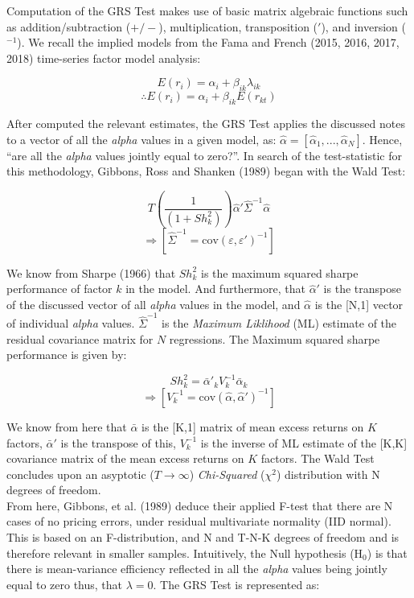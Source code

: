 \documentclass[11pt, english]{article}
\begin{document}
        Computation of the GRS Test makes use of basic matrix algebraic functions such as addition/subtraction ($+/-$), multiplication, transposition ($'$), and inversion ($^{-1}$). We recall the implied models from the Fama and French (2015, 2016, 2017, 2018) time-series factor model analysis:

        $$E(r_i)=\alpha_i+\beta_{ik}\lambda_{ik}$$
        $$\therefore E(r_i)=\alpha_i+\beta_{ik}E(r_{kt})$$

        After computed the relevant estimates, the GRS Test applies the discussed notes to a vector of all the \textit{alpha} values in a given model, as: $\hat{\alpha}=[\hat{\alpha}_1,...,\hat{\alpha}_N]$. Hence, ``are all the \textit{alpha} values jointly equal to zero?''. In search of the test-statistic for this methodology, Gibbons, Ross and Shanken (1989) began with the Wald Test:

        $$T\left(\frac{1}{(1+Sh_k^2)}\right)\hat{\alpha}'\hat{\Sigma}^{-1}\hat{\alpha}$$
        $$\Rightarrow[\hat{\Sigma}^{-1}=\mathrm{cov}(\varepsilon,\varepsilon')^{-1}]$$

        We know from Sharpe (1966) that $Sh_k^2$ is the maximum squared sharpe performance of factor $k$ in the model. And furthermore, that $\hat{\alpha}'$ is the transpose of the discussed vector of all \textit{alpha} values in the model, and $\hat{\alpha}$ is the [N,1] vector of individual \textit{alpha} values. $\hat{\Sigma}^{-1}$ is the \textit{Maximum Liklihood} (ML) estimate of the residual covariance matrix for $N$ regressions. The Maximum squared sharpe performance is given by:

        $$Sh_k^2={\bar{\alpha}'}_kV_k^{-1}{\bar{\alpha}}_k$$
        $$\Rightarrow[V_k^{-1}=\mathrm{cov}(\hat{\alpha},\hat{\alpha}')^{-1}]$$

        We know from here that $\bar{\alpha}$ is the [K,1] matrix of mean excess returns on $K$ factors, ${\bar{\alpha}}'$ is the transpose of this, $V_k^{-1}$ is the inverse of ML estimate of the [K,K] covariance matrix of the mean excess returns on $K$ factors. The Wald Test concludes upon an asyptotic ($T\longrightarrow\infty$) \textit{Chi-Squared} ($\chi^2$) distribution with N degrees of freedom.\\

        From here, Gibbons, et al. (1989) deduce their applied F-test that there are N cases of no pricing errors, under residual multivariate normality (IID normal). This is based on an F-distribution, and N and T-N-K degrees of freedom and is therefore relevant in smaller samples. Intuitively, the Null hypothesis (H$_0$) is that there is mean-variance efficiency reflected in all the \textit{alpha} values being jointly equal to zero thus, that $\lambda=0$. The GRS Test is represented as:
\end{document}
